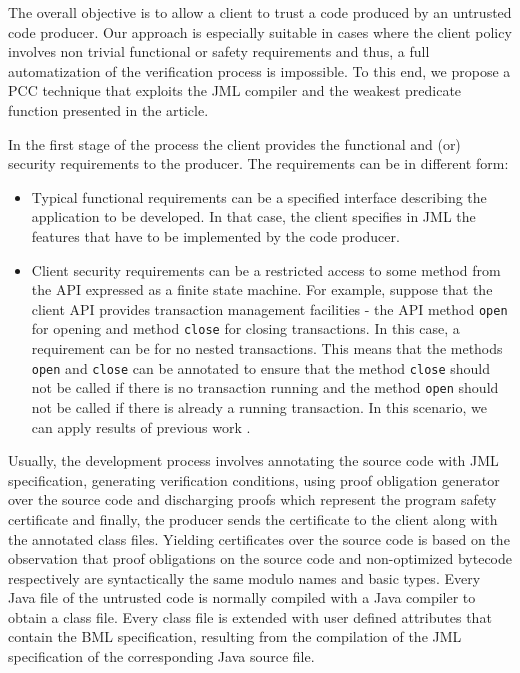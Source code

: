 The overall objective is to allow a client to trust a code produced by an untrusted code producer. Our approach is especially suitable
 in cases where the client policy involves non trivial functional or safety requirements and thus, a full automatization of the verification 
process is impossible. To this end, we propose a PCC technique that exploits the JML compiler and the weakest predicate function presented in the article. 
 
  



In the first stage of the process the client provides the functional
and (or) security requirements to the producer.  The requirements can
be in different form:
\begin{itemize}
\item Typical functional requirements can be a specified interface
describing the application to be developed. In that case, the client
specifies in JML the features that have to be implemented by the code
producer.
\item Client security requirements can be a restricted access to some
method from the API expressed as a finite state machine.  For example,
suppose that the client API provides transaction management facilities
- the API method \texttt{open} for opening and method \texttt{close}
for closing transactions. In this case, a requirement can be for no
nested transactions.  This means that the methods \texttt{open} and
\texttt{close} can be annotated to ensure that the method
\texttt{close} should not be called if there is no transaction running
and the method \texttt{open} should not be called if there is already
a running transaction. In this scenario, we can apply results of
previous work \cite{m+04:cardis}.  
\end{itemize}
Usually, the development process involves annotating the source code
with JML specification, generating verification conditions, using
proof obligation generator over the source code and discharging proofs
which represent the program safety certificate and finally, the
producer sends the certificate to the client along with the annotated
class files.  Yielding certificates over the source code is based on
the observation that proof obligations on the source code and
non-optimized bytecode respectively are syntactically the same modulo
names and basic types. Every Java file of the untrusted code is
normally compiled with a Java compiler to obtain a class file. Every
class file is extended with user defined attributes that contain the
BML specification, resulting from the compilation of the JML
specification of the corresponding Java source file.


